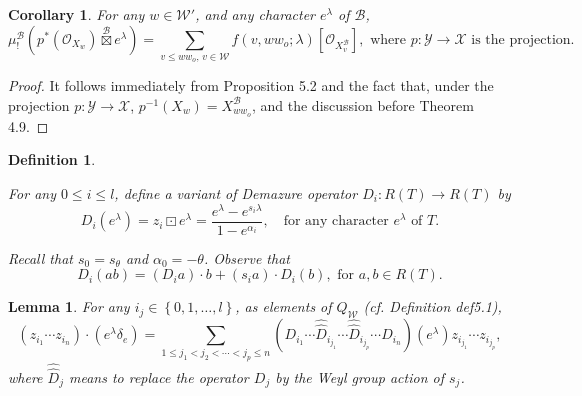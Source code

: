 \documentclass{article}
\newtheorem{definition}[theorem]{Definition}
\newtheorem{lemma}[theorem]{Lemma}
\newtheorem{corollary}[theorem]{Corollary}
\def\X{\mathcal{X}}
\def\B{\mathcal{B}}
\def\W{\mathcal{W}}
\def\Y{\mathcal{Y}}
\def\ref#1{#1}
\begin{document}
\begin{corollary}\label{5.3}
For any $w\in \W'$, and any character $e^\lambda$ of $\B$, 
$$
\mu_!^\B \left(p^*(\mathcal{O}_{X_w}) \overset{\B}{\boxtimes} e^\lambda\right) = \sum_{v\leq ww_o, \,v\in \W}f\left(v,ww_o; \lambda\right)\left[ \mathcal{O}_{X_{v}^\B}\right],
\,\,\mbox{where $p:\Y\to \X$ is the projection}.
$$
\end{corollary}

\begin{proof}
It follows immediately from Proposition \ref{5.2} and the fact that, under the projection $p: \Y \to \X$, $p^{-1}\left(X_w\right) = X^\B_{ww_o}$, and the discussion before Theorem \ref{4.9}. 
\end{proof}

\begin{definition} \label{5.4} \rm{
For any $0\leq i\leq l$, define a variant of \textit{Demazure operator }
$D_i: R(T) \rightarrow R(T)$ by 
$$
D_i(e^\lambda)=z_i\boxdot e^\lambda = \frac{e^\lambda-e^{s_i\lambda}}{1-e^{\alpha_i}}, \quad \mbox{for any character } e^\lambda \mbox{ of } T .
$$


Recall that $s_0=s_\theta$ and $\alpha_0=-\theta$. Observe that 
\begin{equation}\label{5.4.1}
D_i(ab) =(D_ia)\cdot b+(s_ia) \cdot D_i (b) ,\mbox{ for } a,b \in R(T).
\end{equation}}

\end{definition}

\begin{lemma}\label{5.5}
For any $i_j\in \left\{0,1,\ldots , l\right\}$, as elements of $Q_\W$ (cf. Definition \ref{def5.1}), 
$$
\left(z_{i_1}\cdots z_{i_n}\right) \cdot \left( e^\lambda \delta_e\right) = \sum_{1\leq j_1 < j_2 <\cdots< j_p\leq n} \left( D_{i_1} \cdots \hat{\hat{D}}_{i_{j_1}}\cdots \hat{\hat{D}}_{i_{j_p}} \cdots{{D}}_{i_{n}}\right) \left(e^\lambda\right)
z_{i_{j_1}}\cdots z_{i_{j_p}},
$$
where $\hat{\hat{D}}_j$ means to replace the operator $D_j$ by the Weyl group action of $s_j$. 
\end{lemma}
\end{document}
